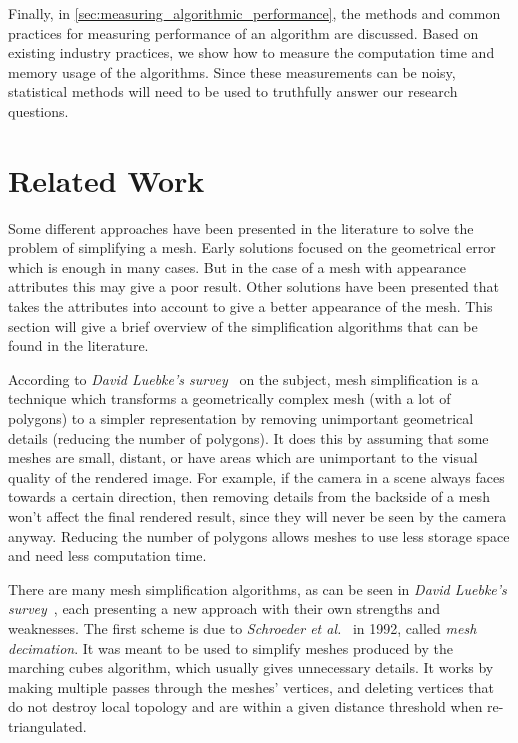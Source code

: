 Finally, in \cref{sec:measuring_algorithmic_performance}, the methods and common practices for measuring performance of an algorithm are discussed. Based on existing industry practices, we show how to measure the computation time and memory usage of the algorithms. Since these measurements can be noisy, statistical methods will need to be used to truthfully answer our research questions.

\section{Related Work} \label{sec:related_work}
Some different approaches have been presented in the literature to solve the problem of simplifying a mesh. Early solutions focused on the geometrical error which is enough in many cases. But in the case of a mesh with appearance attributes this may give a poor result. Other solutions have been presented that takes the attributes into account to give a better appearance of the mesh. This section will give a brief overview of the simplification algorithms that can be found in the literature.

According to \emph{David Luebke's survey}~\cite{luebke2001developer} on the subject, mesh simplification is a technique which transforms a geometrically complex mesh (with a lot of polygons) to a simpler representation by removing unimportant geometrical details (reducing the number of polygons). It does this by assuming that some meshes are small, distant, or have areas which are unimportant to the visual quality of the rendered image. For example, if the camera in a scene always faces towards a certain direction, then removing details from the backside of a mesh won't affect the final rendered result, since they will never be seen by the camera anyway. Reducing the number of polygons allows meshes to use less storage space and need less computation time.

There are many mesh simplification algorithms, as can be seen in \emph{David Luebke's survey}~\cite{luebke2001developer}, each presenting a new approach with their own strengths and weaknesses. The first scheme is due to \emph{Schroeder et al.}~\cite{schroeder1992decimation} in 1992, called \emph{mesh decimation}. It was meant to be used to simplify meshes produced by the marching cubes algorithm, which usually gives unnecessary details. It works by making multiple passes through the meshes' vertices, and deleting vertices that do not destroy local topology and are within a given distance threshold when re-triangulated.

